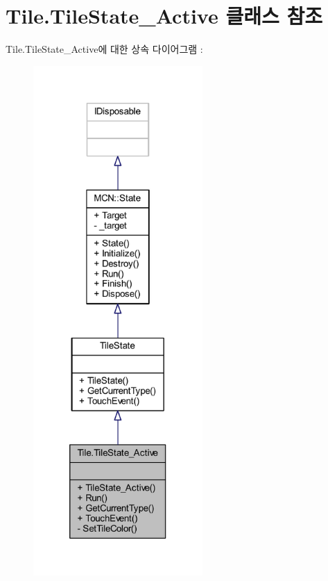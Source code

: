 \hypertarget{class_tile_1_1_tile_state___active}{}\section{Tile.\+Tile\+State\+\_\+\+Active 클래스 참조}
\label{class_tile_1_1_tile_state___active}


Tile.\+Tile\+State\+\_\+\+Active에 대한 상속 다이어그램 \+: \nopagebreak
\begin{figure}[H]
\begin{center}
\leavevmode
\includegraphics[height=550pt]{class_tile_1_1_tile_state___active__inherit__graph}
\end{center}
\end{figure}


